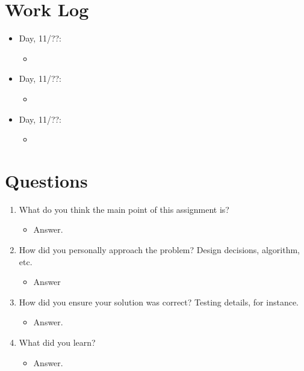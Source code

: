 \documentclass[letterpaper,10pt,onecolumn]{IEEEtran}
\begin{document}
    
    \vspace{6mm}
    
    
    \section*{Work Log}
    
    
    \begin{itemize}
        \item Day, 11/??:
            \begin{itemize} 
                \item 
        	\end{itemize}
        \item Day, 11/??:
            \begin{itemize} 
                \item 
        	\end{itemize}
        \item Day, 11/??:
            \begin{itemize} 
                \item 
        	\end{itemize}
    \end{itemize}
    
    
    \vspace{6mm}
    
   
    \section*{Questions}
    \begin{enumerate}
        \item What do you think the main point of this assignment is?
        \begin{itemize}
            \item Answer.
        \end{itemize}
        \item How did you personally approach the problem? Design decisions, algorithm, etc.
        \begin{itemize}
            \item Answer
        \end{itemize}
        \item How did you ensure your solution was correct? Testing details, for instance.
        \begin{itemize}
            \item Answer.
        \end{itemize}
        \item What did you learn?
        \begin{itemize}
            \item Answer.
        \end{itemize}
    \end{enumerate}
    
    
\end{document}
